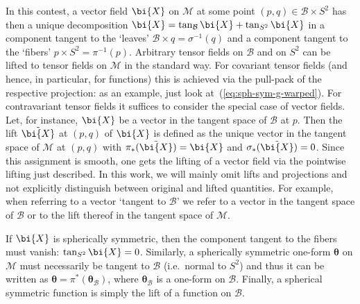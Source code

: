 \documentclass
[rmp,aps,twocolumn,showpacs,preprintnumbers,amsmath,amssymb]{revtex4}
\theoremstyle{plain}
\theoremstyle{definition}
\theoremstyle{remark}
\newcommand{\M}{\mathcal{M}}                      %
\newcommand{\B}{\mathcal{B}}                      %
\newcommand{\Stwo}{{S^2}}                         %
\newcommand{\bX}{\bi{X}}
\newcommand{\btheta}{\boldsymbol{\theta}}
\begin{document}
In this contest, a vector field $\bX$ on $\M$ at some point 
$(p,q)\in\B\times S^2$ has then a unique decomposition 
$\bX = \tan_\B \bX + \tan_\Stwo \bX$ in a component 
tangent to the `leaves' $\B \times q = \sigma^{-1}(q)$ and a component 
tangent to the `fibers' $p \times S^2 = \pi^{-1}(p)$.
Arbitrary tensor fields on $\B$ and on $\Stwo$ can be lifted to tensor fields
on $\M$ in the standard way. For covariant tensor fields (and hence, in 
particular, for functions) this is achieved via the pull-pack of the 
respective projection: as an example, just look 
at~(\ref{eq:sph-sym-g-warped}). 
For contravariant tensor fields it suffices to consider the special case 
of vector fields.
Let, for instance, $\bX$ be a vector in the tangent space of $\B$ at 
$p$. Then the lift $\tilde\bX$ at $(p,q)$ of $\bX$ is defined 
as the unique vector in the tangent space of $\M$ at $(p,q)$
with $\pi_*(\tilde\bX)=\bX$ and $\sigma_*(\tilde\bX)=0$. 
Since this assignment is smooth, one gets the lifting of a vector field 
via the pointwise lifting just described. 
In this work, we will mainly omit lifts and projections and not explicitly 
distinguish between original and lifted quantities. For example, when 
referring to a vector `tangent to $\B$' we refer to a vector in the 
tangent space of $\B$ or to the lift thereof in the tangent space of $\M$.

If $\bX$ is spherically symmetric, then the component tangent to the fibers 
must vanish: $\tan_\Stwo \bX =0$. Similarly, a spherically symmetric 
one-form $\btheta$ on $\M$ must necessarily be tangent to $\B$ (i.e.~normal 
to $S^2$) and thus it can be written as $\btheta = \pi^*(\btheta_\B)$, where 
$\btheta_\B$ is a one-form on $\B$. Finally, a spherical symmetric function 
is simply the lift of a function on $\B$. 
\end{document}
